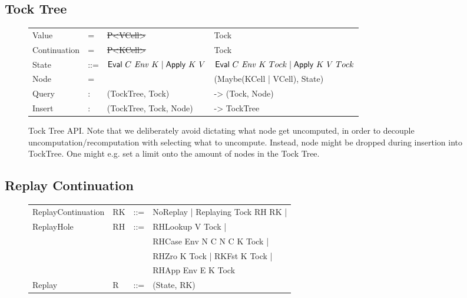 \subsection{Tock Tree}
\begin{figure}
	\begin{tabular}{p{5em} p{3em} p{10em} p{}}
		Value & = & \st{P<VCell>} & Tock \\
		Continuation & = & \st{P<KCell>} & Tock \\
		State & ::= & \st{$\text{\textsf{Eval}}~C~\mathit{Env}~K \mid \text{\textsf{Apply}}~K~V $} & $\text{\textsf{Eval}}~C~\mathit{Env}~K~Tock \mid \text{\textsf{Apply}}~K~V~Tock $ \\
		Node & = & & (Maybe(KCell | VCell), State) \\
		Query & $:$ & (TockTree, Tock) & -> (Tock, Node) \\
		Insert & $:$ & (TockTree, Tock, Node) & -> TockTree \\
	\end{tabular}
	\caption{Tock Tree API. Note that we deliberately avoid dictating what node get uncomputed, in order to decouple uncomputation/recomputation with selecting what to uncompute. Instead, node might be dropped during insertion into TockTree. One might e.g. set a limit onto the amount of nodes in the Tock Tree. }
\end{figure}

\subsection{Replay Continuation}
\begin{figure}
	\begin{tabular}{p{10em} p{2.6em} p{1em} p{}}
		ReplayContinuation & RK & ::= & NoReplay | Replaying Tock RH RK | \\
		ReplayHole & RH & ::= & RHLookup V Tock | \\
		& & & RHCase Env N C N C K Tock | \\
		& & & RHZro K Tock | RKFst K Tock | \\
		& & & RHApp Env E K Tock \\
		Replay & R & ::= & (State, RK) \\
	\end{tabular}
\end{figure}


